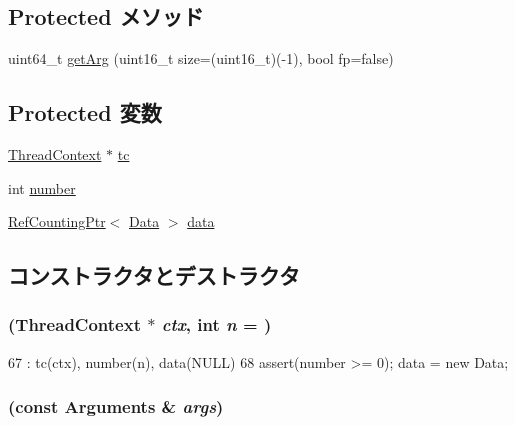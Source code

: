 \subsection*{Protected メソッド}
\begin{DoxyCompactItemize}
\item 
uint64\_\-t \hyperlink{classArguments_a02bee508af9a5d0695592b77fce0eda4}{getArg} (uint16\_\-t size=(uint16\_\-t)(-\/1), bool fp=false)
\end{DoxyCompactItemize}
\subsection*{Protected 変数}
\begin{DoxyCompactItemize}
\item 
\hyperlink{classThreadContext}{ThreadContext} $\ast$ \hyperlink{classArguments_a4455a4759e69e5ebe68ae7298cbcc37d}{tc}
\item 
int \hyperlink{classArguments_a7106e2abc437ad981830d14176d15f09}{number}
\item 
\hyperlink{classRefCountingPtr}{RefCountingPtr}$<$ \hyperlink{classArguments_1_1Data}{Data} $>$ \hyperlink{classArguments_a8621be0cca1e69cde818d4136fd6d104}{data}
\end{DoxyCompactItemize}


\subsection{コンストラクタとデストラクタ}
\hypertarget{classArguments_a55f2456ddc19c77f4a61be8f602eaa49}{
\subsubsection[{Arguments}]{ ({\bf ThreadContext} $\ast$ {\em ctx}, \/  int {\em n} = {})}}
\label{classArguments_a55f2456ddc19c77f4a61be8f602eaa49}



\begin{DoxyCode}
67         : tc(ctx), number(n), data(NULL)
68         { assert(number >= 0); data = new Data;}
\end{DoxyCode}
\hypertarget{classArguments_a0eea816ed3db85f5b50b6d378dd1ace0}{
\subsubsection[{Arguments}]{ (const {\bf Arguments} \& {\em args})}}
\label{classArguments_a0eea816ed3db85f5b50b6d378dd1ace0}



